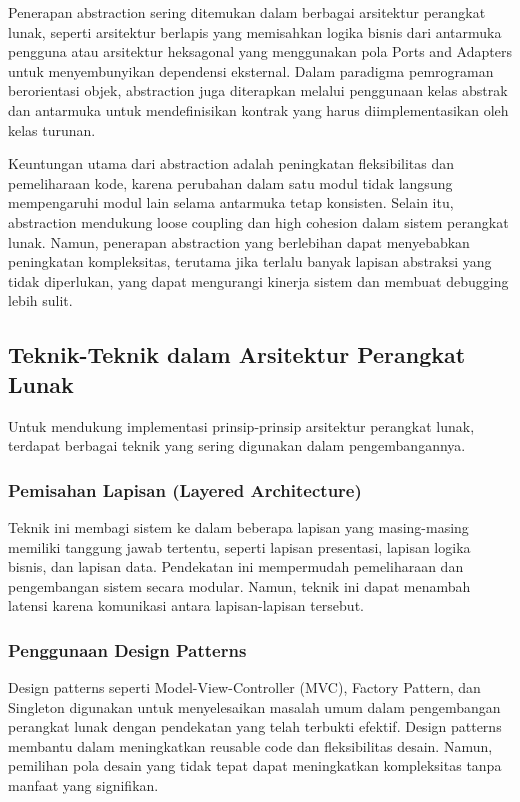 Penerapan abstraction sering ditemukan dalam berbagai arsitektur perangkat lunak, seperti arsitektur berlapis yang memisahkan logika bisnis dari antarmuka pengguna atau arsitektur heksagonal yang menggunakan pola Ports and Adapters untuk menyembunyikan dependensi eksternal. Dalam paradigma pemrograman berorientasi objek, abstraction juga diterapkan melalui penggunaan kelas abstrak dan antarmuka untuk mendefinisikan kontrak yang harus diimplementasikan oleh kelas turunan.

Keuntungan utama dari abstraction adalah peningkatan fleksibilitas dan pemeliharaan kode, karena perubahan dalam satu modul tidak langsung mempengaruhi modul lain selama antarmuka tetap konsisten. Selain itu, abstraction mendukung loose coupling dan high cohesion dalam sistem perangkat lunak. Namun, penerapan abstraction yang berlebihan dapat menyebabkan peningkatan kompleksitas, terutama jika terlalu banyak lapisan abstraksi yang tidak diperlukan, yang dapat mengurangi kinerja sistem dan membuat debugging lebih sulit.


\subsection{Teknik-Teknik dalam Arsitektur Perangkat Lunak}

Untuk mendukung implementasi prinsip-prinsip arsitektur perangkat lunak, terdapat berbagai teknik yang sering digunakan dalam pengembangannya.

\subsubsection{Pemisahan Lapisan (Layered Architecture)}
Teknik ini membagi sistem ke dalam beberapa lapisan yang masing-masing memiliki tanggung jawab tertentu, seperti lapisan presentasi, lapisan logika bisnis, dan lapisan data. Pendekatan ini mempermudah pemeliharaan dan pengembangan sistem secara modular. Namun, teknik ini dapat menambah latensi karena komunikasi antara lapisan-lapisan tersebut.

\subsubsection{Penggunaan Design Patterns}
Design patterns seperti Model-View-Controller (MVC), Factory Pattern, dan Singleton digunakan untuk menyelesaikan masalah umum dalam pengembangan perangkat lunak dengan pendekatan yang telah terbukti efektif. Design patterns membantu dalam meningkatkan reusable code dan fleksibilitas desain. Namun, pemilihan pola desain yang tidak tepat dapat meningkatkan kompleksitas tanpa manfaat yang signifikan.

